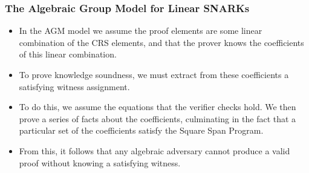 \documentclass{beamer}
\begin{document}
\begin{frame}
    \frametitle{The Algebraic Group Model for Linear SNARKs}

    \begin{itemize}
        \item In the AGM model we assume the proof elements are some linear combination of the CRS elements, and that the prover knows the coefficients of this linear combination. 
        \item To prove knowledge soundness, we must extract from these coefficients a satisfying witness assignment.
        \item To do this, we assume the equations that the verifier checks hold. We then prove a series of facts about the coefficients, culminating in the fact that a particular set of the coefficients satisfy the Square Span Program.
        \item From this, it follows that any algebraic adversary cannot produce a valid proof without knowing a satisfying witness.
    \end{itemize}

\end{frame}
\end{document}
